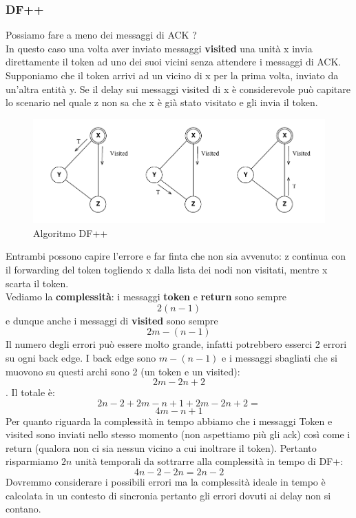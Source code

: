 \documentclass[12pt]{article}
\begin{document}
		\subsubsection{DF++}
			Possiamo fare a meno dei messaggi di ACK ?\\
			In questo caso una volta aver inviato messaggi \textbf{visited} una unità x invia direttamente il token ad uno dei suoi vicini senza attendere i messaggi di ACK. Supponiamo che il token arrivi ad un vicino di x per la prima volta, inviato da un'altra entità y. Se il delay sui messaggi visited di x è considerevole può capitare lo scenario nel quale z non sa che x è già stato visitato e gli invia il token.
			\begin{figure}[h!]
				\centering
				\includegraphics[scale=0.3]{img/df++.png}
				\caption{Algoritmo DF++}
			\end{figure}
			Entrambi possono capire l'errore e far finta che non sia avvenuto: z continua con il forwarding del token togliendo x dalla lista dei nodi non visitati, mentre x scarta il token.\\
			Vediamo la \textbf{complessità}: i messaggi \textbf{token }e \textbf{return }sono sempre $$2(n-1)$$ e dunque anche i messaggi di \textbf{visited} sono sempre $$2m-(n-1) $$ Il numero degli errori può essere molto grande, infatti potrebbero esserci 2 errori su ogni back edge. I back edge sono $m-(n-1) $ e i messaggi sbagliati che si muovono su questi archi sono 2 (un token e un visited): $$2m-2n+2 $$. Il totale è:
			$$2n-2+2m-n+1+2m-2n+2 =  $$
			$$4m-n+1 $$ 
			Per quanto riguarda la complessità in tempo abbiamo che i messaggi Token e visited sono inviati nello stesso momento (non aspettiamo più gli ack) così come i return (qualora non ci sia nessun vicino a cui inoltrare il token). Pertanto risparmiamo $2n $ unità temporali da sottrarre alla complessità in tempo di DF+:
			$$4n-2-2n = 2n-2 $$
			Dovremmo considerare i possibili errori ma la complessità ideale in tempo è calcolata in un contesto di sincronia pertanto gli errori dovuti ai delay non si contano.
			
\end{document}
